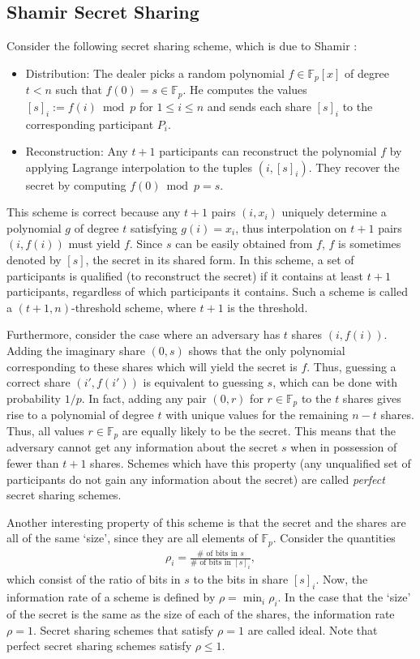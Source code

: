 \documentclass[11pt]{article}
\newcommand{\F}{\mathbb{F}}
\begin{document}
\subsection*{Shamir Secret Sharing}
Consider the following secret sharing scheme, which is due to Shamir \cite{Sham79}:
\begin{itemize}
 \item{Distribution: The dealer picks a random polynomial $f \in \F_p[x]$ of degree $t < n$ such that $f(0) = s\in \F_p$. He computes the values $[s]_i := f(i)\bmod{p}$ for $1\leq i\leq n$ and sends each share $[s]_i$ to the corresponding participant $P_i$.}
 \item{Reconstruction: Any $t+1$ participants can reconstruct the polynomial $f$ by applying Lagrange interpolation to the tuples $(i,[s]_i)$. They recover the secret by computing $f(0)\bmod{p} = s$.}
\end{itemize}
This scheme is correct because any $t+1$ pairs $(i,x_i)$ uniquely determine a polynomial $g$ of degree $t$ satisfying $g(i) = x_i$, thus interpolation on $t+1$ pairs $(i,f(i))$ must yield $f$. Since $s$ can be easily obtained from $f$, $f$ is sometimes denoted by $[s]$, the secret in its shared form. In this scheme, a set of participants is qualified (to reconstruct the secret) if it contains at least $t+1$ participants, regardless of which participants it contains. Such a scheme is called a $(t+1,n)$-threshold scheme, where $t+1$ is the threshold. 

Furthermore, consider the case where an adversary has $t$ shares $(i,f(i))$. Adding the imaginary share $(0,s)$ shows that the only polynomial corresponding to these shares which will yield the secret is $f$. Thus, guessing a correct share $(i',f(i'))$ is equivalent to guessing $s$, which can be done with probability $1/p$. In fact, adding any pair $(0,r)$ for $r\in\F_p$ to the $t$ shares gives rise to a polynomial of degree $t$ with unique values for the remaining $n-t$ shares. Thus, all values $r\in\F_p$ are equally likely to be the secret. This means that the adversary cannot get any information about the secret $s$ when in possession of fewer than $t+1$ shares. Schemes which have this property (any unqualified set of participants do not gain any information about the secret) are called {\it perfect} secret sharing schemes.

Another interesting property of this scheme is that the secret and the shares are all of the same `size', since they are all elements of $\F_p$. Consider the quantities
  \begin{align*} 
  \rho_i = \frac{\# \text{ of bits in } s}{ \# \text{ of bits in } [s]_i},
  \end{align*}
which consist of the ratio of bits in $s$ to the bits in share $[s]_i$. Now, the information rate of a scheme is defined by $\rho = \min_i \rho_i$. In the case that the `size' of the secret is the same as the size of each of the shares, the information rate $\rho = 1$. Secret sharing schemes that satisfy $\rho = 1$ are called ideal. Note that perfect secret sharing schemes satisfy $\rho \leq 1$.
\end{document}
